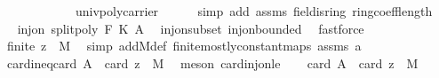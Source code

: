 \begin{isabellebody}
\ \ \ \ \ \ \ \ \ \ \ \ univ{\isacharunderscore}{\kern0pt}poly{\isacharunderscore}{\kern0pt}carrier{\isacharparenright}{\kern0pt}\isanewline
\ \ \ \ \isamarkupfalse%
\ {\isacharparenleft}{\kern0pt}simp\ add{\isacharcolon}{\kern0pt}\ assms{\isacharparenleft}{\kern0pt}{}{\isacharparenright}{\kern0pt}\ field{\isachardot}{\kern0pt}is{\isacharunderscore}{\kern0pt}ring\ ring{\isachardot}{\kern0pt}coeff{\isacharunderscore}{\kern0pt}length{\isacharparenright}{\kern0pt}\isanewline
\ \ \isamarkupfalse%
\ \isamarkupfalse%
\ {\isachardoublequoteopen}inj{\isacharunderscore}{\kern0pt}on\ {\isacharparenleft}{\kern0pt}split{\isacharunderscore}{\kern0pt}poly\ F\ K{\isacharparenright}{\kern0pt}\ {\isacharquery}{\kern0pt}A{\isachardoublequoteclose}\ \isamarkupfalse%
\ inj{\isacharunderscore}{\kern0pt}on{\isacharunderscore}{\kern0pt}subset\ inj{\isacharunderscore}{\kern0pt}on{\isacharunderscore}{\kern0pt}bounded\ \isamarkupfalse%
\ fastforce\isanewline
\ \ \isamarkupfalse%
\ \isamarkupfalse%
\ {\isachardoublequoteopen}finite\ {\isacharparenleft}{\kern0pt}{\isacharbraceleft}{\kern0pt}z{\isacharbraceright}{\kern0pt}\ {\isasymtimes}\ M{\isacharparenright}{\kern0pt}{\isachardoublequoteclose}\ \isamarkupfalse%
\ {\isacharparenleft}{\kern0pt}simp\ add{\isacharcolon}{\kern0pt}M{\isacharunderscore}{\kern0pt}def\ finite{\isacharunderscore}{\kern0pt}mostly{\isacharunderscore}{\kern0pt}constant{\isacharunderscore}{\kern0pt}maps\ assms{\isacharparenleft}{\kern0pt}{}{\isacharparenright}{\kern0pt}\ a{\isacharparenright}{\kern0pt}\isanewline
\ \ \isamarkupfalse%
\ \isamarkupfalse%
\ card{\isacharunderscore}{\kern0pt}ineq{\isacharunderscore}{\kern0pt}{}{\isacharcolon}{\kern0pt}{\isachardoublequoteopen}card\ {\isacharquery}{\kern0pt}A\ {\isasymle}\ card\ {\isacharparenleft}{\kern0pt}{\isacharbraceleft}{\kern0pt}z{\isacharbraceright}{\kern0pt}\ {\isasymtimes}\ M{\isacharparenright}{\kern0pt}{\isachardoublequoteclose}\ \isamarkupfalse%
\ {\isacharparenleft}{\kern0pt}meson\ card{\isacharunderscore}{\kern0pt}inj{\isacharunderscore}{\kern0pt}on{\isacharunderscore}{\kern0pt}le{\isacharparenright}{\kern0pt}\isanewline
\isanewline
\ \ \isamarkupfalse%
\ {\isachardoublequoteopen}card\ {\isacharquery}{\kern0pt}A\ {\isacharequal}{\kern0pt}\ card\ {\isacharparenleft}{\kern0pt}{\isacharbraceleft}{\kern0pt}z{\isacharbraceright}{\kern0pt}\ {\isasymtimes}\ M{\isacharparenright}{\kern0pt}{\isachardoublequoteclose}\ \isamarkupfalse%

\end{isabellebody}
